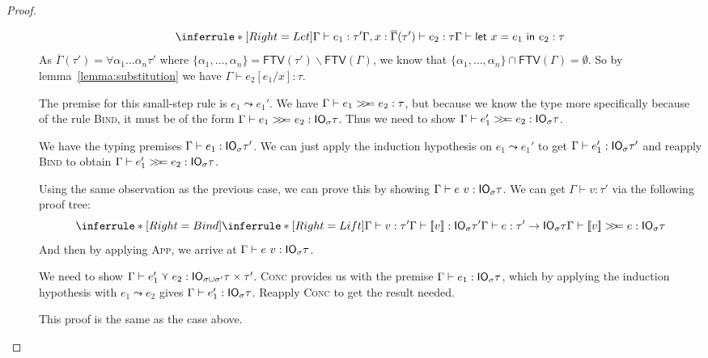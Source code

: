 \begin{proof}
\begin{description}
  \item[]
    $$
    \inferrule*[Right=Let]{\Gamma \vdash e_1 : \tau' \\ \Gamma, x : \overline{\Gamma}(\tau') \vdash e_2 : \tau}{\Gamma \vdash \letin{x = e_1}{e_2} : \tau}
    $$
    As $\overline{\Gamma}(\tau') = \forall \alpha_1 \ldots \alpha_n \tau'$ where $\{\alpha_1,\ldots,\alpha_n\} =
    \textsf{FTV}(\tau') \backslash \textsf{FTV}(\Gamma)$, we know that $\{\alpha_1,\ldots,\alpha_n\} \cap
    \textsf{FTV}(\Gamma) = \emptyset$.
    So by lemma~\ref{lemma:substitution} we have $\Gamma \vdash e_2 [e_1/x] : \tau$.

  \item[]
    The premise for this small-step rule is $e_1 \leadsto e_1'$. We have $\Gamma
    \vdash e_1 >\!\!>\!\!= e_2 : \tau$, but because we know the type more
    specifically because of the rule \textsc{Bind}, it must be of
    the form $\Gamma \vdash e_1 >\!\!>\!\!= e_2 : \mathsf{IO}_\sigma \tau$. Thus we need to show $\Gamma
    \vdash e_1' >\!\!>\!\!= e_2 : \mathsf{IO}_\sigma \tau$.

    We have the typing premises $\Gamma \vdash e_1 : \mathsf{IO}_\sigma \tau'$. We can just
    apply the induction hypothesis on $e_1 \leadsto e_1'$ to get $\Gamma \vdash e_1'
    : \mathsf{IO}_\sigma \tau'$ and reapply \textsc{Bind} to obtain $\Gamma \vdash e_1' >\!\!>\!\!=
    e_2 : \mathsf{IO}_\sigma \tau$.

  \item[]
    Using the same observation as the previous case, we can prove this
    by showing $\Gamma \vdash e \ v : \mathsf{IO}_\sigma \tau$.
    We can get $\Gamma \vdash v : \tau'$ via the following proof tree:
    $$\inferrule*[Right=Bind]{\inferrule*[Right=Lift]{\Gamma \vdash v : \tau'}
      {\Gamma \vdash \lift{v} : \IO_\sigma \tau'} \\ \Gamma \vdash e : \tau' \rightarrow \IO_\sigma \tau}
    {\Gamma \vdash \lift{v} \bind e : \IO_\sigma \tau}$$
    And then by applying \textsc{App}, we arrive at $\Gamma \vdash e \ v : \mathsf{IO}_\sigma
    \tau$.

  \item[]
    We need to show $\Gamma \vdash e_1' \curlyvee e_2 : \mathsf{IO}_{\sigma \cup \sigma'} \tau \times
    \tau'$. \textsc{Conc} provides us with the premise $\Gamma \vdash e_1 : \mathsf{IO}_\sigma
    \tau$, which by applying the induction hypothesis with $e_1 \leadsto e_2$
    gives $\Gamma \vdash e_1' : \mathsf{IO}_\sigma \tau$. Reapply \textsc{Conc} to get the
    result needed.
  \item[]
    This proof is the same as the case above.
    

\end{description}
\end{proof}
